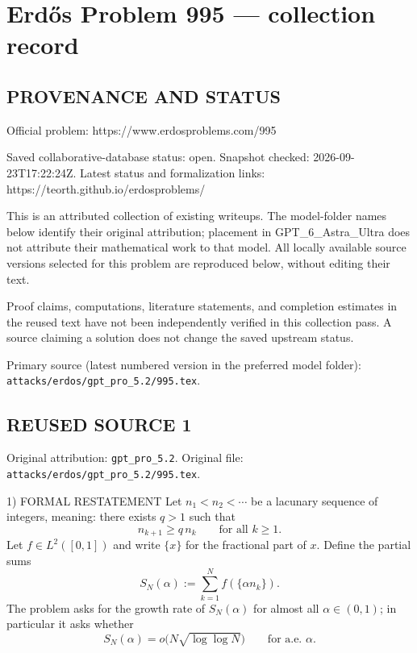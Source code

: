 \section*{Erd\H{o}s Problem 995 --- collection record}

\subsection*{PROVENANCE AND STATUS}
Official problem: https://www.erdosproblems.com/995

Saved collaborative-database status: open.
Snapshot checked: 2026-09-23T17:22:24Z.
Latest status and formalization links: https://teorth.github.io/erdosproblems/

This is an attributed collection of existing writeups. The model-folder names below identify their original attribution; placement in GPT\_6\_Astra\_Ultra does not attribute their mathematical work to that model. All locally available source versions selected for this problem are reproduced below, without editing their text.

Proof claims, computations, literature statements, and completion estimates in the reused text have not been independently verified in this collection pass. A source claiming a solution does not change the saved upstream status.

Primary source (latest numbered version in the preferred model folder): \texttt{attacks/erdos/gpt\_pro\_5.2/995.tex}.

\subsection*{REUSED SOURCE 1}
Original attribution: \texttt{gpt\_pro\_5.2}.
Original file: \texttt{attacks/erdos/gpt\_pro\_5.2/995.tex}.


1) FORMAL RESTATEMENT
Let $n_1<n_2<\cdots$ be a lacunary sequence of integers, meaning: there exists $q>1$ such that
\[
 n_{k+1}\ge q\,n_k\qquad\text{for all }k\ge 1.
\]
Let $f\in L^2([0,1])$ and write $\{x\}$ for the fractional part of $x$.
Define the partial sums
\[
 S_N(\alpha):=\sum_{k=1}^N f(\{\alpha n_k\}).
\]
The problem asks for the growth rate of $S_N(\alpha)$ for almost all $\alpha\in(0,1)$; in particular it asks whether
\[
 S_N(\alpha)=o\bigl(N\sqrt{\log\log N}\bigr)\qquad\text{for a.e. }\alpha.
\]

